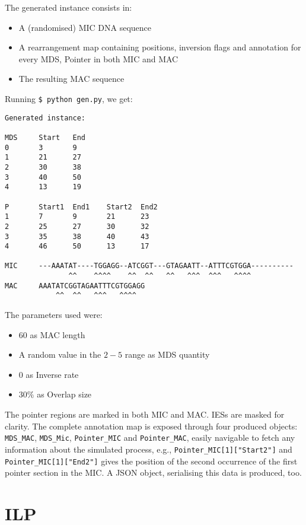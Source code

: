 The generated instance consists in:

\begin{itemize}
	\item A (randomised) MIC DNA sequence
	\item A rearrangement map containing positions, inversion flags and annotation for every MDS, Pointer in both MIC and MAC
	\item The resulting MAC sequence
\end{itemize}

Running \texttt{\$ python gen.py}, we get:
\begin{verbatim}
Generated instance:

MDS     Start   End
0       3       9
1       21      27
2       30      38
3       40      50
4       13      19

P       Start1  End1    Start2  End2
1       7       9       21      23
2       25      27      30      32
3       35      38      40      43
4       46      50      13      17

MIC     ---AAATAT----TGGAGG--ATCGGT---GTAGAATT--ATTTCGTGGA----------
               ^^    ^^^^    ^^  ^^   ^^   ^^^  ^^^   ^^^^
MAC     AAATATCGGTAGAATTTCGTGGAGG
            ^^  ^^   ^^^   ^^^^
\end{verbatim}
The parameters used were:

\begin{itemize}
	\item $60$ as MAC length
	\item A random value in the $2-5$ range as MDS quantity
	\item $0$ as Inverse rate
	\item $30\%$ as Overlap size
\end{itemize}

The pointer regions are marked in both MIC and MAC. IESs are masked for clarity. The complete annotation map is exposed through four produced objects: \texttt{MDS\_MAC}, \texttt{MDS\_Mic}, \texttt{Pointer\_MIC} and \texttt{Pointer\_MAC}, easily navigable to fetch any information about the simulated process, e.g., \texttt{Pointer\_MIC[1]["Start2"]} and \texttt{Pointer\_MIC[1]["End2"]} gives the position of the second occurrence of the first pointer section in the MIC. A JSON object, serialising this data is produced, too.

\section{ILP}



